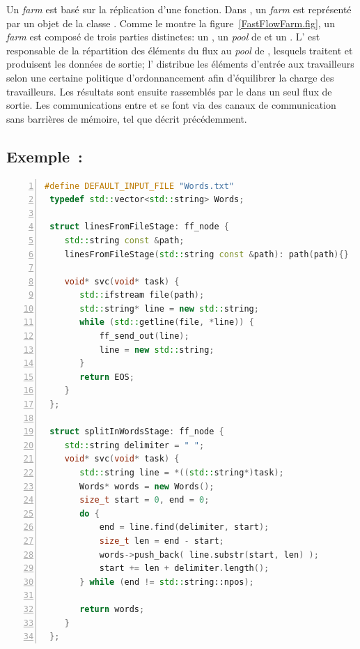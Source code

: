 Un \emph{farm} est bas\'e sur la r\'eplication d'une fonction. Dans , un \emph{farm} est repr\'esent\'e par un objet de la classe . Comme le montre la figure~\ref{FastFlowFarm.fig}, un \emph{farm} est compos\'e de trois parties distinctes: un , un  \emph{pool} de  et un . L' est responsable de la r\'epartition des \'el\'ements du flux au \emph{pool} de , lesquels traitent et produisent les donn\'ees de sortie; l' distribue les \'el\'ements d'entr\'ee aux travailleurs selon une certaine politique d'ordonnancement afin d'\'equilibrer la charge des travailleurs. Les r\'esultats sont ensuite rassembl\'es par le  dans un seul flux de sortie. Les communications entre  et  se font via des canaux de communication sans barri\`eres de m\'emoire, tel que d\'ecrit pr\'ec\'edemment.


\subsection{Exemple~: }


\begin{lstlisting}[language=c++, 
caption={Le code source \TT{FastFlow} d'une application pour compter le nombre d'occurrences de mots.},
label={wordcountFastFlow},
frame=single,
float,
numbers=left
]
 #define DEFAULT_INPUT_FILE "Words.txt"
 typedef std::vector<std::string> Words;
 
 struct linesFromFileStage: ff_node {
    std::string const &path;
    linesFromFileStage(std::string const &path): path(path){}
 
    void* svc(void* task) {
       std::ifstream file(path);
       std::string* line = new std::string;
       while (std::getline(file, *line)) {
           ff_send_out(line);
           line = new std::string;
       }
       return EOS;
    }
 };
 
 struct splitInWordsStage: ff_node {
    std::string delimiter = " ";
    void* svc(void* task) {
       std::string line = *((std::string*)task);
       Words* words = new Words();
       size_t start = 0, end = 0;
       do {
           end = line.find(delimiter, start);
           size_t len = end - start;
           words->push_back( line.substr(start, len) );
           start += len + delimiter.length();
       } while (end != std::string::npos);

       return words;
    }
 };
\end{lstlisting}
 
